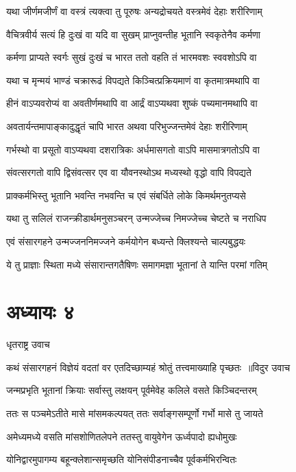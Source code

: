 \twolineshloka
{यथा जीर्णमजीर्णं वा वस्त्रं त्यक्त्वा तु पूरुषः}
{अन्यद्रोचयते वस्त्रमेवं देहाः शरीरिणाम्}


\twolineshloka
{वैचित्रवीर्य सत्यं हि दुःखं वा यदि वा सुखम्}
{प्राप्नुवन्तीह भूतानि स्वकृतेनैव कर्मणा}


\twolineshloka
{कर्मणा प्राप्यते स्वर्गः सुखं दुःखं च भारत}
{ततो वहति तं भारमवशः स्ववशोऽपि वा}


\twolineshloka
{यथा च मृन्मयं भाण्डं चक्रारूढं विपद्यते}
{किञ्चित्प्रक्रियमाणं वा कृतमात्रमथापि वा}


\twolineshloka
{हीनं वाऽप्यवरोप्यं वा अवतीर्णमथापि वा}
{आर्द्रं वाऽप्यथवा शुष्कं पच्यमानमथापि वा}


\twolineshloka
{अवतार्यन्तमापाङ्कादुद्धृतं चापि भारत}
{अथवा परिभुज्जन्तमेवं देहाः शरीरिणाम्}


\twolineshloka
{गर्भस्थो वा प्रसूतो वाऽप्यथवा दशरात्रिकः}
{अर्धमासगतो वाऽपि मासमात्रगतोऽपि वा}


\twolineshloka
{संवत्सरगतो वापि द्विसंवत्सर एव वा}
{यौवनस्थोऽथ मध्यस्थो वृद्धो वापि विपद्यते}


\twolineshloka
{प्राक्कर्मभिस्तु भूतानि भवन्ति नभवन्ति च}
{एवं संबर्धिते लोके किमर्थमनुतप्यसे}


\twolineshloka
{यथा तु सलिलं राजन्क्रीडार्थमनुसञ्चरन्}
{उन्मज्जेच्च निमज्जेच्च चेष्टते च नराधिप}


\twolineshloka
{एवं संसारगहने उन्मज्जननिमज्जने}
{कर्मयोगेन बध्यन्ते क्लिश्यन्ते चाल्पबुद्धयः}


\twolineshloka
{ये तु प्राज्ञाः स्थिता मध्ये संसारान्तगतैषिणः}
{समागमज्ञा भूतानां ते यान्ति परमां गतिम्}


\chapter{अध्यायः ४}
\twolineshloka
{धृतराष्ट्र उवाच}
{}


\threelineshloka
{कथं संसारगहनं विज्ञेयं वदतां वर}
{एतदिच्छाम्यहं श्रोतुं तत्त्वमाख्याहि पृच्छतः ॥विदुर उवाच}
{}


\twolineshloka
{जन्मप्रभृति भूतानां क्रियाः सर्वास्तु लक्षयन्}
{पूर्वमेवेह कलिले वसते किञ्चिदन्तरम्}


\twolineshloka
{ततः स पञ्चमेऽतीते मासे मांसमकल्पयत्}
{ततः सर्वाङ्गसम्पूर्णो गर्भो मासे तु जायते}


\twolineshloka
{अमेध्यमध्ये वसति मांसशोणितलेपने}
{ततस्तु वायुवेगेन ऊर्ध्वपादो ह्यधोमुखः}


\twolineshloka
{योनिद्वारमुपागम्य बहून्क्लेशान्समृच्छति}
{योनिसंपीडनाच्चैव पूर्वकर्मभिरन्वितः}



